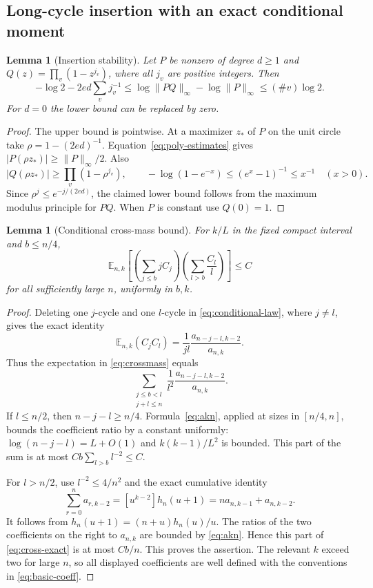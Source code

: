 \documentclass[11pt]{article}
\newtheorem{lemma}[theorem]{Lemma}
\theoremstyle{definition}\newtheorem{definition}[theorem]{Definition}
\theoremstyle{remark}\newtheorem{remark}[theorem]{Remark}
\newcommand{\E}{\mathbb E}\newcommand{\Pp}{\mathbb P}
\numberwithin{equation}{section}\allowdisplaybreaks
\begin{document}
\subsection{Long-cycle insertion with an exact conditional moment}
\begin{lemma}[Insertion stability]\label{lem:insertion}
Let $P$ be nonzero of degree $d\ge1$ and
$Q(z)=\prod_v(1-z^{j_v})$, where all $j_v$ are positive integers. Then
\begin{equation}\label{eq:insertion}
 -\log2-2ed\sum_vj_v^{-1}
 \le\log\|PQ\|_\infty-\log\|P\|_\infty
 \le(\#v)\log2.
\end{equation}
For $d=0$ the lower bound can be replaced by zero.
\end{lemma}
\begin{proof}
The upper bound is pointwise. At a maximizer $z_*$ of $P$ on the unit
circle take $\rho=1-(2ed)^{-1}$. Equation~\eqref{eq:poly-estimates}
gives $|P(\rho z_*)|\ge\|P\|_\infty/2$. Also
\[
 |Q(\rho z_*)|\ge\prod_v(1-\rho^{j_v}),\qquad
 -\log(1-e^{-x})\le(e^x-1)^{-1}\le x^{-1}\quad(x>0).
\]
Since $\rho^j\le e^{-j/(2ed)}$, the claimed lower bound follows from
the maximum modulus principle for $PQ$. When $P$ is constant use
$Q(0)=1$.
\end{proof}

\begin{lemma}[Conditional cross-mass bound]\label{lem:crossmass}
For $k/L$ in the fixed compact interval and $b\le n/4$,
\begin{equation}\label{eq:crossmass}
 \E_{n,k}\left[
 \left(\sum_{j\le b}jC_j\right)
 \left(\sum_{l>b}\frac{C_l}{l}\right)\right]\le C
\end{equation}
for all sufficiently large $n$, uniformly in $b,k$.
\end{lemma}
\begin{proof}
Deleting one $j$-cycle and one $l$-cycle in \eqref{eq:conditional-law},
where $j\ne l$, gives the exact identity
\[
 \E_{n,k}(C_jC_l)=\frac1{jl}\frac{a_{n-j-l,k-2}}{a_{n,k}}.
\]
Thus the expectation in \eqref{eq:crossmass} equals
\begin{equation}\label{eq:cross-exact}
 \sum_{\substack{j\le b<l\\j+l\le n}}
 \frac1{l^2}\frac{a_{n-j-l,k-2}}{a_{n,k}}.
\end{equation}
If $l\le n/2$, then $n-j-l\ge n/4$. Formula~\eqref{eq:akn}, applied
at sizes in $[n/4,n]$, bounds the coefficient ratio by a constant
uniformly: $\log(n-j-l)=L+O(1)$ and
$k(k-1)/L^2$ is bounded. This part of the sum is at most
$Cb\sum_{l>b}l^{-2}\le C$.

For $l>n/2$, use $l^{-2}\le4/n^2$ and the exact cumulative identity
\begin{equation}\label{eq:sum-a}
 \sum_{r=0}^n a_{r,k-2}
 =[u^{k-2}]h_n(u+1)
 =n a_{n,k-1}+a_{n,k-2}.
\end{equation}
It follows from $h_n(u+1)=(n+u)h_n(u)/u$.
The ratios of the two coefficients on the right to $a_{n,k}$ are
bounded by \eqref{eq:akn}. Hence this part of \eqref{eq:cross-exact}
is at most $Cb/n$. This proves the assertion. The relevant $k$ exceed
two for large $n$, so all displayed coefficients are well defined with
the conventions in \eqref{eq:basic-coeff}.
\end{proof}
\end{document}
